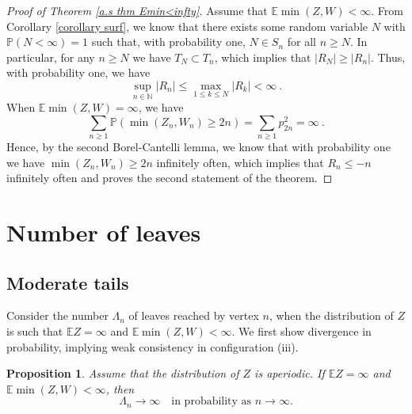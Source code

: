 \documentclass[12pt]{article}
\newcommand{\N}{\mathbb{N}}
\newcommand{\E}{\mathbb{E}}
\newtheorem{proposition}[theorem]{Proposition}
\numberwithin{equation}{section} \font\titre=cmbx12
\newcommand{\prob}[1]{\mathbb{P}\left( #1 \right)}
\newcommand{\rightmost}{R}
\newcommand{\leaves}{\Lambda}
\begin{document}
\begin{proof}[Proof of Theorem \ref{a.s thm Emin<infty}]
    Assume that $\E \min(Z,W) < \infty$. From Corollary \ref{corollary surf}, we know that there exists some random variable $N$ with $\prob{N<\infty}=1$ such that, with probability one, $N\in S_n$ for all $n\ge N$.
    In particular, for any $n\ge N$ we have $T_N\subset T_n$, which implies that $|\rightmost_N|\ge |\rightmost_n|$. Thus, with probability one, we have $$\sup_{n\in \N}|\rightmost_n| \le \max_{1\le k \le N} |\rightmost_k| < \infty~.$$
When $\E \min(Z,W) = \infty$, we have  
$$\sum_{n\ge 1} \prob{\min (Z_n,W_n)\ge 2n}=\sum_{n\ge 1}p_{2n}^2 =\infty~.$$
    Hence, by the second Borel-Cantelli lemma, we know that with probability one we have $\min(Z_n,W_n)\ge 2n$ infinitely often, which implies that $\rightmost_n\le -n$ infinitely often and proves the second statement of the theorem.
    
\end{proof}


\section{Number of leaves}
\label{sec:numberofleaves}

\subsection{Moderate tails}
\label{sec:moderate}

Consider the number $\leaves_n$ of leaves reached by vertex $n$, when the distribution of $Z$ is such that $\E Z = \infty$ and $\E \min(Z,W) < \infty$. 
We first show divergence in probability,
implying weak consistency in configuration (iii).


\color{black}
\begin{proposition}\label{weak behavior case 2}
    Assume that the distribution of $Z$ is aperiodic. If $\E Z = \infty$ and $\E \min(Z,W) < \infty$, then
    $$
    \leaves_n \to \infty \quad \text{in probability as } n \to \infty.
    $$
\end{proposition}
\end{document}
